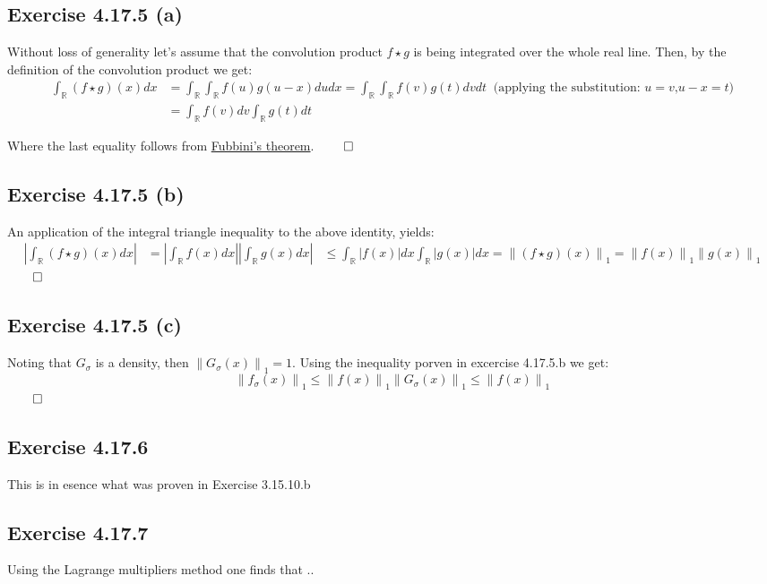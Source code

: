 \documentclass{exam}
\renewenvironment{proof}{{\noindent\itshape\ignorespaces}}{{\hfill$\qed$\\}}
\begin{document}
\subsection*{Exercise 4.17.5 (a)}
\begin{proof}
    Without loss of generality let's assume that the convolution product $f \star g$ is being integrated over the whole real line. Then, by the definition of the 
    convolution product we get:\\
    \begin{equation*}
        \begin{aligned}
            \int_{\mathbb{R}} (f \star g) (x) d x  &= \displaystyle \int_{\mathbb{R}} \int_{\mathbb{R}} f(u) g(u-x) du dx = \displaystyle \int_{\mathbb{R}} \int_{\mathbb{R}} f(v) g(t) dv dt   \ \text{ (applying the substitution: } u = v \text{,}  u- x = t \text{)}\\
            &= \int_{\mathbb{R}} f(v) d v \displaystyle \int_{\mathbb{R}} g(t) dt
        \end{aligned}    
    \end{equation*}
    
Where the last equality follows from \href{https://en.wikipedia.org/wiki/Fubini%27s_theorem}{Fubbini's theorem}.
\end{proof}
\subsection*{Exercise 4.17.5 (b)}
\begin{proof}
    An application of the integral triangle inequality to the above identity, yields:
    \begin{equation*}
        \begin{aligned}
        \left| \int_{\mathbb{R}} (f \star g) (x) d x  \right| &= \left| \int_{\mathbb{R}} f (x) d x  \right| \left| \int_{\mathbb{R}} g (x) d x  \right|
        &\leq \int_{\mathbb{R}} \left|  f (x) \right| d x  \int_{\mathbb{R}} \left|  g (x) \right| d x = {\lVert (f\star g )(x) \lVert}_{1} = {\lVert f(x) \lVert}_{1}{\lVert g(x) \lVert}_{1}
        \end{aligned}    
    \end{equation*} 
\end{proof}
\subsection*{Exercise 4.17.5 (c)}
\begin{proof}
    \noindent Noting that $G_{\sigma}$ is a density, then ${\lVert G_{\sigma}(x) \lVert}_{1} = 1$. Using the inequality porven in excercise 4.17.5.b we get:\\
    \begin{equation}
        {\lVert f_{\sigma}(x) \lVert}_{1} \leq {\lVert f(x) \lVert}_{1}{\lVert G_{\sigma}(x) \lVert}_{1} \leq {\lVert f(x) \lVert}_{1} 
    \end{equation}
\end{proof}    

\subsection*{Exercise 4.17.6}
This is in esence what was proven in Exercise 3.15.10.b  

\subsection*{Exercise 4.17.7}
Using the Lagrange multipliers method one finds that ..
\end{document}
